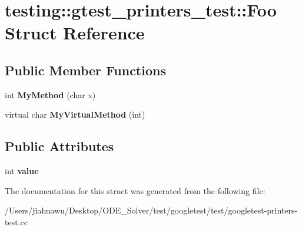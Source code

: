 \hypertarget{structtesting_1_1gtest__printers__test_1_1_foo}{}\section{testing\+:\+:gtest\+\_\+printers\+\_\+test\+:\+:Foo Struct Reference}
\label{structtesting_1_1gtest__printers__test_1_1_foo}
\subsection*{Public Member Functions}
\begin{DoxyCompactItemize}
\item 
\mbox{\label{structtesting_1_1gtest__printers__test_1_1_foo_a703c1159114f3a640b16d470a9613672}} 
int {\bfseries My\+Method} (char x)
\item 
\mbox{\label{structtesting_1_1gtest__printers__test_1_1_foo_a368dc5150b27c2aaca6034830334e1cd}} 
virtual char {\bfseries My\+Virtual\+Method} (int)
\end{DoxyCompactItemize}
\subsection*{Public Attributes}
\begin{DoxyCompactItemize}
\item 
\mbox{\label{structtesting_1_1gtest__printers__test_1_1_foo_a8171a69191d34071ea4448d2dda501ec}} 
int {\bfseries value}
\end{DoxyCompactItemize}


The documentation for this struct was generated from the following file\+:\begin{DoxyCompactItemize}
\item 
/\+Users/jiahuawu/\+Desktop/\+O\+D\+E\+\_\+\+Solver/test/googletest/test/googletest-\/printers-\/test.\+cc\end{DoxyCompactItemize}
